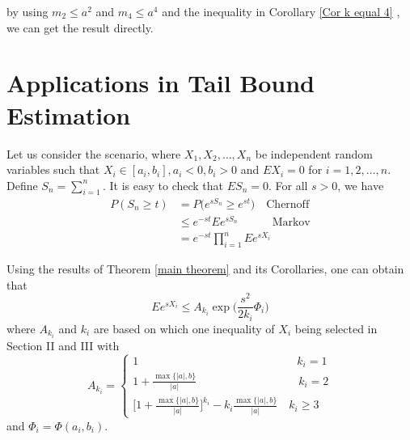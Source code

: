 \documentclass[journal]{IEEEtran}
\newtheorem{thm}{Theorem}%
\begin{document}
\begin{IEEEproof}
by using
$m_2\leq a^2$ and $m_4 \leq a^4$ and the inequality in Corollary \ref{Cor k equal 4} , we can get the result directly.
\end{IEEEproof}

\section{Applications in Tail Bound Estimation}
Let us consider the scenario, where $X_1,X_2,\dots,X_n$ be independent random variables such that $X_i\in [a_i, b_i], a_i<0, b_i>0$ and $EX_i=0$ for $i=1,2,\dots,n$. Define $S_n=\sum_{i=1}^n$.
It is easy to check that $ES_n=0$.  For all $s>0$, we have
\begin{equation}
 \begin{split}P(S_n\geq t){}& = P\big(e^{sS_n}\geq e^{st}\big) \quad \text{Chernoff} {}\\
&\leq e^{-st}Ee^{sS_n} \quad \quad \quad \text{Markov}\\
&= e^{-st} \prod _{i=1}^n Ee^{sX_i}
\end{split}
\end{equation}

Using the results of Theorem \ref{main theorem} and its Corollaries, one can obtain that
\begin{equation}
Ee^{sX_i}\leq A_{k_i} \exp\Big(\frac{s^2}{2k_i}\Phi_i\Big)
\end{equation}
where $A_{k_i}$ and $k_i$ are based on which one inequality of $X_i$ being selected in Section II and III with
\begin{equation}
A_{k_i}= \begin{cases} 1 \quad \quad \quad \quad \quad \quad \quad \quad \quad \quad \quad \quad \quad \quad k_i=1\\
1+\frac{\max\{|a|,b\}}{|a|} \quad \quad \quad \quad \quad \quad \quad \quad  \quad k_i=2\\
\Big[1+\frac{\max\{|a|,b\}}{|a|}\Big]^{k_i}-k_i\frac{\max\{|a|,b\}}{|a|} \quad k_i\geq 3
\end{cases}
\end{equation}
and
$\Phi_i=\Phi(a_i,b_i)$.
\end{document}
